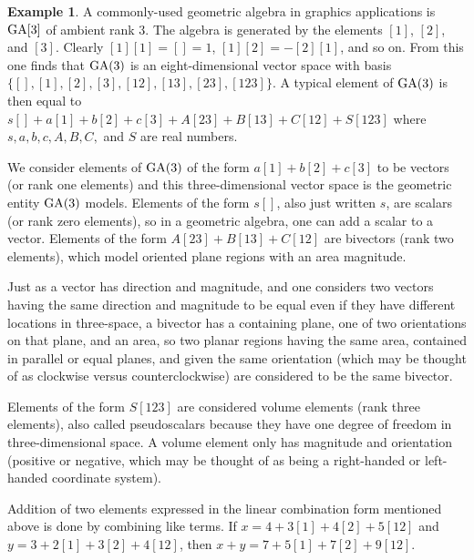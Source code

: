 \documentclass{amsproc}
\theoremstyle{definition}
\newtheorem{example}[theorem]{Example}
\theoremstyle{remark}
\numberwithin{equation}{section}
\begin{document}
\begin{example}
A commonly-used geometric algebra in graphics applications is $\mathop{\mathrm{GA}}[3]$
of ambient rank $3$.  The algebra is generated by the elements $[1]$,
$[2]$, and $[3]$.  Clearly $[1][1] = [] = 1$, $[1][2]=-[2][1]$, and so
on.  From this one finds that $\mathop{\mathrm{GA}}(3)$ is an eight-dimensional vector
space with basis $\{[], [1], [2], [3], [12], [13], [23], [123]\}$.  A
typical element of $\mathop{\mathrm{GA}}(3)$ is then equal to $s[] + a[1] + b[2] + c[3]
+ A[23] + B[13] + C[12] + S[123]$ where $s, a, b, c, A, B, C,$ and $S$
are real numbers.

We consider elements of $\mathop{\mathrm{GA}}(3)$ of the form $a[1]+b[2]+c[3]$ to be
vectors (or rank one elements) and this three-dimensional vector space
is the geometric entity $\mathop{\mathrm{GA}}(3)$ models.  Elements of the form $s[]$,
also just written $s$, are scalars (or rank zero elements), so in a
geometric algebra, one can add a scalar to a vector.  Elements of the
form $A[23] + B[13] + C[12]$ are bivectors (rank two elements), which
model oriented plane regions with an area magnitude.

Just as a vector has direction and magnitude, and one considers two
vectors having the same direction and magnitude to be equal even if
they have different locations in three-space, a bivector has a
containing plane, one of two orientations on that plane, and an area,
so two planar regions having the same area, contained in parallel or
equal planes, and given the same orientation (which may be thought of
as clockwise versus counterclockwise) are considered to be the same
bivector.

Elements of the form $S[123]$ are considered volume elements (rank
three elements), also called pseudoscalars because they have one
degree of freedom in three-dimensional space.  A volume element only
has magnitude and orientation (positive or negative, which may be
thought of as being a right-handed or left-handed coordinate system).

Addition of two elements expressed in the linear combination form
mentioned above is done by combining like terms.  If $x = 4 + 3[1] +
4[2] + 5[12]$ and $y = 3 + 2[1] + 3[2] + 4[12]$, then
$x+y = 7 +5[1] +7[2] + 9[12]$.


\end{example}
\end{document}

